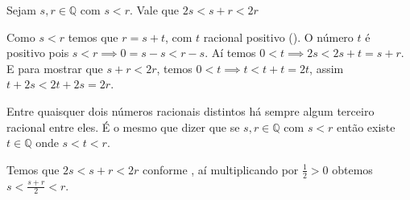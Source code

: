 \documentclass[../main.tex]{subfiles}
\begin{document}
\begin{prop}\label{rac-prop-somaEntreDobro}
    Sejam $s, r \in \mathbb{Q}$ com $s < r$. Vale que $2s < s+r < 2r$
\end{prop}
\begin{dem}
    Como $s < r$ temos que $r = s + t$, com $t$ racional positivo ().
    O número $t$ é positivo pois $s < r \implies 0 = s-s < r-s$. Aí temos $0 < t \implies 2s < 2s+t = s+r$. E para mostrar que $s+r < 2r$, temos
    $0 < t \implies t < t+t = 2t$, assim $t+2s < 2t+2s = 2r$. 
\end{dem}

\begin{corol}\label{rac-corol-terceiroEntreDois}
    Entre quaisquer dois números racionais distintos há sempre algum terceiro racional entre eles. É o mesmo que dizer
    que se $s,r \in \mathbb{Q}$ com $s<r$ então existe $t \in \mathbb{Q}$ onde $s < t < r$.
\end{corol}
\begin{dem}
    Temos que $2s < s+r < 2r$ conforme , aí multiplicando por $\frac{1}{2} > 0$ obtemos $s < \frac{s+r}{2} < r$.
\end{dem}
\end{document}
